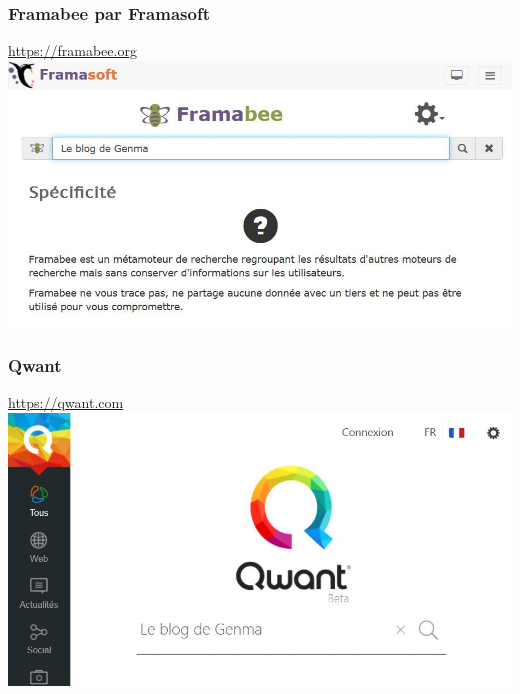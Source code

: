 \documentclass{beamer}
\begin{document}
\begin{frame}
\begin{center}
\frametitle{Framabee par Framasoft}

\url{https://framabee.org}
\\
\includegraphics[scale=0.6] {./images/Framabee.jpg}
\end{center}
\end{frame}

\begin{frame}
\begin{center}
\frametitle{Qwant}

\url{https://qwant.com}
\\
\includegraphics[scale=0.6] {./images/Qwant.jpg}
\end{center}
\end{frame}
\end{document}
